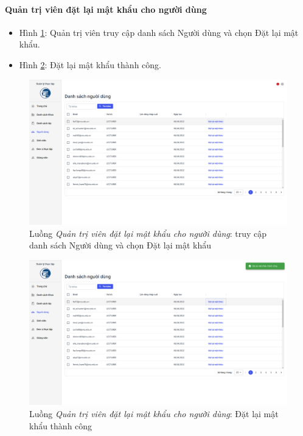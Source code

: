\documentclass[./../main.tex]{subfiles}
\begin{document}
\paragraph*{Quản trị viên đặt lại mật khẩu cho người dùng}

\begin{itemize}
	\item Hình \ref{fig:admin_access_list_users}: Quản trị viên truy cập danh sách Người dùng và chọn Đặt lại mật khẩu.
	\item Hình \ref{fig:reset_password_success}: Đặt lại mật khẩu thành công.
\end{itemize}

\begin{figure}[]
	\includegraphics[width=\linewidth]{./images/image69.png}
	\caption{Luồng \emph{Quản trị viên đặt lại mật khẩu cho người dùng}: truy cập danh sách Người dùng và chọn Đặt lại mật khẩu}
	\label{fig:admin_access_list_users}
\end{figure}

\begin{figure}[]
	\includegraphics[width=\linewidth]{./images/image70.png}
	\caption{Luồng \emph{Quản trị viên đặt lại mật khẩu cho người dùng}: Đặt lại mật khẩu thành công}
	\label{fig:reset_password_success}
\end{figure}
\end{document}
